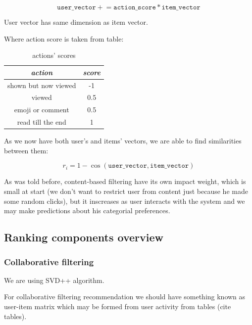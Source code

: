 \documentclass{article}
\begin{document}
\begin{equation}
    \texttt{user\_vector} \mathrel{+}= \texttt{action\_score} * \texttt{item\_vector}
\end{equation}

User vector has same dimension as item vector.

Where action score is taken from table:

\begin{table}[h]
    \centering
    \begin{tabular}{cc}
        \toprule
        \textit{action} & \textit{score} \\
        \midrule
        shown but now viewed & -1 \\
        viewed & 0.5 \\
        emoji or comment & 0.5 \\
        read till the end & 1 \\
        \bottomrule
    \end{tabular}%
    \caption{actions' scores}
    \label{tab:action_score}
\end{table}

As we now have both user's and items' vectors, we are able to find similarities between them:

\begin{equation}
    r_i = 1 - \cos{(\texttt{user\_vector}, \texttt{item\_vector})}
\end{equation}


As was told before, content-based filtering have its own impact weight, which is small at start (we don't want to restrict user from content just because he made some random clicks), but it inscreases as user interacts with the system and we may make predictions about his categorial preferences.

\subsection{Ranking components overview}



\subsubsection{Collaborative filtering}

We are using SVD++ algorithm.

For collaborative filtering recommendation we should have something known as user-item matrix which may be formed from user activity from tables (cite tables).
\end{document}
